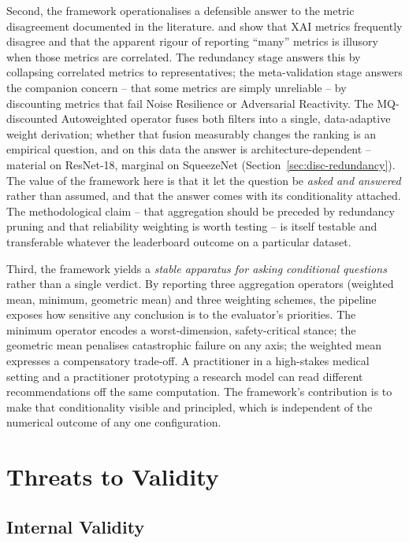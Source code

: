 Second, the framework operationalises a defensible answer to the metric
disagreement documented in the literature. \citet{krishna2024disagreement} and
\citet{tomsett2020sanity} show that XAI metrics frequently disagree and that
the apparent rigour of reporting ``many'' metrics is illusory when those
metrics are correlated. The redundancy stage answers this by collapsing
correlated metrics to representatives; the meta-validation stage answers the
companion concern -- that some metrics are simply unreliable
\citep{hedstrom2024metaquantus} -- by discounting metrics that fail Noise
Resilience or Adversarial Reactivity. The MQ-discounted Autoweighted operator
fuses both filters into a single, data-adaptive weight derivation; whether
that fusion measurably changes the ranking is an empirical question, and on
this data the answer is architecture-dependent -- material on ResNet-18,
marginal on SqueezeNet (Section~\ref{sec:disc-redundancy}). The value of the
framework here is that it let the question be \emph{asked and answered}
rather than assumed, and that the answer comes with its conditionality
attached. The
methodological claim -- that aggregation should be preceded by redundancy pruning
and that reliability weighting is worth testing -- is itself testable and
transferable whatever the leaderboard outcome on a particular dataset.

Third, the framework yields a \emph{stable apparatus for asking conditional
questions} rather than a single verdict. By reporting three aggregation
operators (weighted mean, minimum, geometric mean) and three weighting schemes,
the pipeline exposes how sensitive any conclusion is to the evaluator's
priorities. The minimum operator encodes a worst-dimension, safety-critical
stance; the geometric mean penalises catastrophic failure on any axis; the
weighted mean expresses a compensatory trade-off. A practitioner in a
high-stakes medical setting and a practitioner prototyping a research model can
read different recommendations off the same computation. The framework's
contribution is to make that conditionality visible and principled, which is
independent of the numerical outcome of any one configuration.

\section{Threats to Validity}
\label{sec:disc-threats}

\subsection{Internal Validity}

